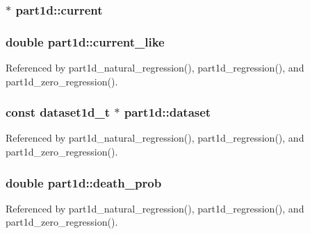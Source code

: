 \subsubsection[{\texorpdfstring{current}{current}}]{$\ast$ part1d\+::current}\hypertarget{structpart1d_a6f750deb0ee1bbe79c17d1d2459e53c4}{}\label{structpart1d_a6f750deb0ee1bbe79c17d1d2459e53c4}
\subsubsection[{\texorpdfstring{current\+\_\+like}{current_like}}]{\setlength{\rightskip}{0pt plus 5cm}double part1d\+::current\+\_\+like}\hypertarget{structpart1d_a76d098391e7a6a8f0575a695ff780fe5}{}\label{structpart1d_a76d098391e7a6a8f0575a695ff780fe5}


Referenced by part1d\+\_\+natural\+\_\+regression(), part1d\+\_\+regression(), and part1d\+\_\+zero\+\_\+regression().

\subsubsection[{\texorpdfstring{dataset}{dataset}}]{\setlength{\rightskip}{0pt plus 5cm}const {\bf dataset1d\+\_\+t} $\ast$ part1d\+::dataset}\hypertarget{structpart1d_aa3c75da174a531e47a74dd96150a93db}{}\label{structpart1d_aa3c75da174a531e47a74dd96150a93db}


Referenced by part1d\+\_\+natural\+\_\+regression(), part1d\+\_\+regression(), and part1d\+\_\+zero\+\_\+regression().

\subsubsection[{\texorpdfstring{death\+\_\+prob}{death_prob}}]{\setlength{\rightskip}{0pt plus 5cm}double part1d\+::death\+\_\+prob}\hypertarget{structpart1d_a538591f7d53c2f21ab61a509fd743ae7}{}\label{structpart1d_a538591f7d53c2f21ab61a509fd743ae7}


Referenced by part1d\+\_\+natural\+\_\+regression(), part1d\+\_\+regression(), and part1d\+\_\+zero\+\_\+regression().

